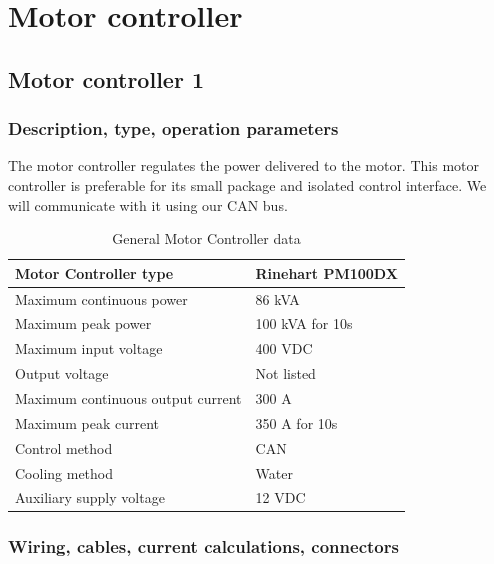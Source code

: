 \documentclass{article}
\begin{document}
\section{Motor controller}\label{motor_controller}
\subsection{Motor controller 1}\label{motor_controller_1}
\subsubsection{Description, type, operation parameters}

The motor controller regulates the power delivered to the motor. This motor controller is preferable for its small package and isolated control interface. We will communicate with it using our CAN bus. 

\begin{table}[H]
	\centering
	\begin{tabular}{|l|l|}
	\hline
	Motor Controller type & Rinehart PM100DX \\ \hline
	Maximum continuous power & 86 kVA \\ \hline
	Maximum peak power & 100 kVA for 10s \\ \hline
	Maximum input voltage & 400 VDC \\ \hline
	Output voltage & Not listed \\ \hline
	Maximum continuous output current & 300 A \\ \hline
	Maximum peak current & 350 A for 10s \\ \hline
	Control method & CAN \\ \hline
	Cooling method & Water \\ \hline   
	Auxiliary supply voltage & 12 VDC \\ \hline
	\end{tabular}
	\caption{General Motor Controller data}
	\label{MC}
\end{table}

\subsubsection{Wiring, cables, current calculations, connectors}
\end{document}

